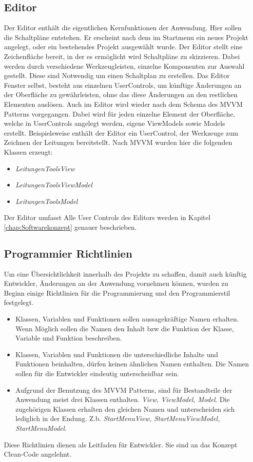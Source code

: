 \subsection{Editor}
\label{chap:Editor}
Der Editor enthält die eigentlichen Kernfunktionen der Anwendung. Hier sollen die Schaltpläne entstehen. Er erscheint nach dem im Startmenu 
ein neues Projekt angelegt, oder ein bestehendes Projekt ausgewählt wurde. Der Editor stellt eine Zeichenfläche bereit, in der es ermöglicht 
wird Schaltpläne zu skizzieren. Dabei werden durch verschiedene Werkzeugleisten, einzelne Komponenten zur Auswahl gestellt. Diese sind 
Notwendig um einen Schaltplan zu erstellen. Das Editor Fenster selbst, besteht aus einzelnen UserControls, um künftige Änderungen an der 
Oberfläche zu gewährleisten, ohne das diese Änderungen an den restlichen Elementen auslösen. Auch im Editor wird wieder nach dem Schema des 
MVVM Patterns vorgegangen. Dabei wird für jeden einzelne Element der Oberfläche, welche in UserControls angelegt werden, eigene ViewModels 
sowie Models erstellt. Beispielsweise enthält der Editor ein UserControl, der Werkzeuge zum Zeichnen der Leitungen bereitstellt. Nach MVVM 
wurden hier die folgenden Klassen erzeugt:
\begin{itemize}
    \item \textit{LeitungenToolsView}  
    \item \textit{LeitungenToolsViewModel} 
    \item \textit{LeitungenToolsModel}
\end{itemize}
Der Editor umfasst 
Alle User Controls des Editors werden in Kapitel \ref{chap:Softwarekonzept} genauer beschrieben.
\subsection{Programmier Richtlinien}
Um eine Übersichtlichkeit innerhalb des Projekts zu schaffen, damit auch künftig Entwickler, Änderungen an der Anwendung vornehmen können, wurden zu Beginn einige Richtlinien für die Programmierung und den Programmierstil festgelegt. 
\begin{itemize}
    \item Klassen, Variablen und Funktionen sollen aussagekräftige Namen erhalten. Wenn Möglich sollen die Namen den Inhalt bzw die Funktion der Klasse, Variable und Funktion beschreiben. 
    \item Klassen, Variablen und Funktionen die unterschiedliche Inhalte und Funktionen beinhalten, dürfen keinen ähnlichen Namen enthalten. Die Namen sollen für die Entwickler eindeutig unterscheidbar sein. 
    \item Aufgrund der Benutzung des MVVM Patterns, sind für Bestandteile der Anwendung meist drei Klassen enthalten. \textit{View, ViewModel, Model}. Die zugehörigen Klassen erhalten den gleichen Namen und unterscheiden sich lediglich in der Endung. Z.b. \textit{StartMenuView, StartMenuViewModel, StartMenuModel}.
\end{itemize} 
Diese Richtlinien dienen als Leitfaden für Entwickler. Sie sind an das Konzept Clean-Code angelehnt. 
